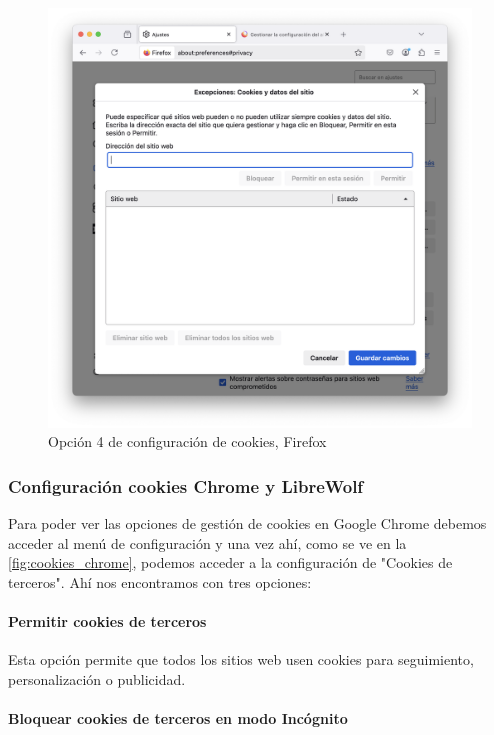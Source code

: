 \begin{figure}[H]   
    \includegraphics[width=\textwidth]{opcion4_ej14.png}
    \caption{Opción 4 de configuración de cookies, Firefox}
    \label{fig:opcion4_ej14}
\end{figure}


\subsubsection{Configuración cookies Chrome y LibreWolf}

Para poder ver las opciones de gestión de cookies en Google Chrome debemos acceder al menú de configuración y una vez ahí, como se ve en la \ref{fig:cookies_chrome}, podemos acceder a la configuración de "Cookies de terceros". Ahí nos encontramos con tres opciones: 

\paragraph{Permitir cookies de terceros}

Esta opción permite que todos los sitios web usen cookies para seguimiento, personalización o publicidad. 

\paragraph{Bloquear cookies de terceros en modo Incógnito}

